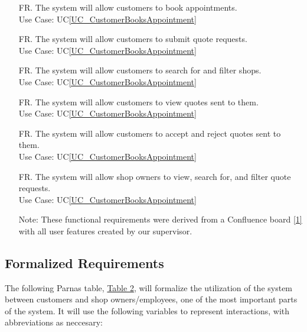 \documentclass[12pt]{article}
\newcounter{reqnum} %
\begin{document}
\begin{itemize}
\item[FR\refstepcounter{reqnum}\thereqnum \label{R_BookAppointment}.] The system will allow customers to book appointments.\\
Use Case: UC\ref{UC_CustomerBooksAppointment}

\item[FR\refstepcounter{reqnum}\thereqnum \label{R_SubmitQuoteRequests}.] The system will allow customers to submit quote requests.\\
Use Case: UC\ref{UC_CustomerBooksAppointment}

\item[FR\refstepcounter{reqnum}\thereqnum \label{R_SearchShop}.] The system will allow customers to search for and filter shops.\\
Use Case: UC\ref{UC_CustomerBooksAppointment}

\item[FR\refstepcounter{reqnum}\thereqnum \label{R_CustViewQuote}.] The system will allow customers to view quotes sent to them.\\
Use Case: UC\ref{UC_CustomerBooksAppointment}

\item[FR\refstepcounter{reqnum}\thereqnum \label{R_AcceptREjectQuote}.] The system will allow customers to accept and reject quotes sent to them.\\
Use Case: UC\ref{UC_CustomerBooksAppointment}

\item[FR\refstepcounter{reqnum}\thereqnum \label{R_ViewQuoteReqs}.] The system will allow shop owners  to view, search for, and filter quote requests.\\
Use Case: UC\ref{UC_CustomerBooksAppointment}

Note: These functional requirements were derived from a Confluence board \hyperref[1]{[1]} with all user features created by our supervisor.

\end{itemize}

\subsection{Formalized Requirements}

The following Parnas table, \hyperref[tab:formal]{Table 2}, will formalize the utilization of the system between customers and shop owners/employees, one of the most important parts of the system. It will use the following variables to represent interactions, with abbreviations as neccesary:
\end{document}
